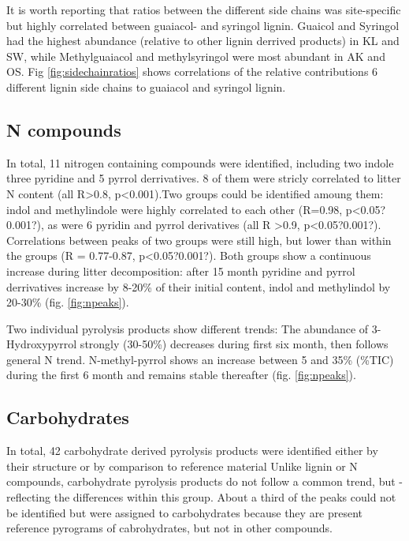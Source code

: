 \documentclass[preprint,review,12pt]{elsarticle}
\begin{document}
It is worth reporting that ratios between the different side chains was site-specific but highly correlated between guaiacol- and syringol lignin. Guaicol and Syringol had the highest abundance (relative to other lignin derrived products) in KL and SW, while Methylguaiacol and methylsyringol were most abundant in AK and OS. Fig \ref{fig:sidechainratios} shows correlations of the relative contributions 6 different lignin side chains to guaiacol and syringol lignin. 



\subsection{N compounds}


In total, 11 nitrogen containing compounds were identified, including two indole three pyridine and 5 pyrrol derrivatives. 8 of them were stricly correlated to litter N content (all R\textgreater 0.8, p\textless 0.001).Two groups could be identified amoung them: indol and methylindole were highly correlated to each other (R=0.98, p\textless 0.05?0.001?), as were 6 pyridin and pyrrol derivatives (all R \textgreater 0.9, p\textless 0.05?0.001?). Correlations between peaks of two groups were still high, but lower than within the groups (R = 0.77-0.87, p\textless 0.05?0.001?). Both groups show a continuous increase during litter decomposition: after 15 month pyridine and pyrrol derrivatives increase by 8-20\% of their initial content, indol and methylindol by 20-30\% (fig. \ref{fig:npeaks}).

Two individual pyrolysis products show different trends:  The abundance of 3-Hydroxypyrrol strongly (30-50\%) decreases during first six month, then follows general N trend. N-methyl-pyrrol shows an increase between 5 and 35\% (\%TIC) during the first 6 month and remains stable thereafter (fig. \ref{fig:npeaks}).

\subsection{Carbohydrates}
In total, 42 carbohydrate derived pyrolysis products were identified either by their structure or by comparison to reference material %
Unlike lignin or N compounds, carbohydrate pyrolysis products do not follow a common trend, but - reflecting the differences within this group. About a third of the peaks could not be identified but were assigned to carbohydrates because they are present reference pyrograms of cabrohydrates, but not in other compounds.
\end{document}
